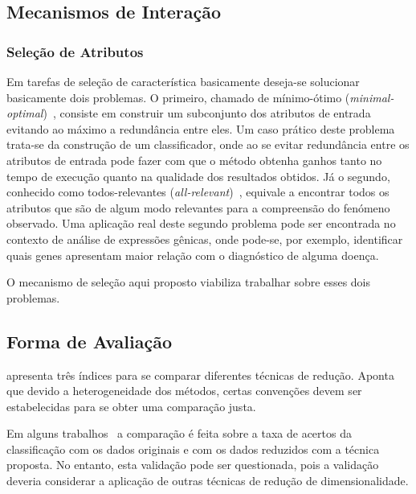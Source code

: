 \subsection{Mecanismos de Interação}

\subsubsection{Seleção de Atributos}

Em tarefas de seleção de característica basicamente deseja-se solucionar basicamente dois problemas. 
O primeiro, chamado de mínimo-ótimo (\emph{minimal-optimal})~\cite{Kohavi1997}, consiste em construir um subconjunto dos atributos de entrada evitando ao máximo a redundância entre eles. 
Um caso prático deste problema trata-se da construção de um classificador, onde ao se evitar redundância entre os atributos de entrada pode fazer com que o método obtenha ganhos tanto no tempo de execução quanto na qualidade dos resultados obtidos. 
Já o segundo, conhecido como todos-relevantes (\emph{all-relevant})~\cite{Nilsson2007}, equivale a encontrar todos os atributos que são de algum modo relevantes para a compreensão do fenómeno observado. 
Uma aplicação real deste segundo problema pode ser encontrada no contexto de análise de expressões gênicas, onde pode-se, por exemplo, identificar quais genes apresentam maior relação com o diagnóstico de alguma doença. 

O mecanismo de seleção aqui proposto viabiliza trabalhar sobre esses dois problemas.

\subsection{Forma de Avaliação}


\cite{Medeiros2011} apresenta três índices para se comparar diferentes técnicas de redução. Aponta que devido a heterogeneidade dos métodos, certas convenções devem ser estabelecidas para se obter uma comparação justa.

Em alguns trabalhos~\cite{Joshi2007} a comparação é feita sobre a taxa de acertos da classificação com os dados originais e com os dados reduzidos com a técnica proposta. No entanto, esta validação pode ser questionada, pois a validação deveria considerar a aplicação de outras técnicas de redução de dimensionalidade. 


